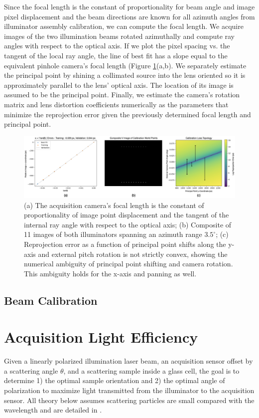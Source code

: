 Since the focal length is the constant of proportionality for beam angle and image pixel displacement and the beam directions are known for all azimuth angles from illuminator assembly calibration, we can compute the focal length. We acquire images of the two illumination beams rotated azimuthally and compute ray angles with respect to the optical axis. If we plot the pixel spacing vs. the tangent of the local ray angle, the line of best fit has a slope equal to the equivalent pinhole camera's focal length (Figure \ref{fig:acquisition_camera_calibration}(a,b). We separately estimate the principal point by shining a collimated source into the lens oriented so it is approximately parallel to the lens' optical axis. The location of its image is assumed to be the principal point. Finally, we estimate the camera's rotation matrix and lens distortion coefficients numerically as the parameters that minimize the reprojection error given the previously determined focal length and principal point.
\begin{figure}
    \centering
    \includegraphics[width=\linewidth]{../figures/acqusition_camera_calibration.png}
    \caption{(a) The acquisition camera's focal length is the constant of proportionality of image point displacement and the tangent of the internal ray angle with respect to the optical axis; (b) Composite of 11 images of both illuminators spanning an azimuth range $3.5^\circ$; (c) Reprojection error as a function of principal point shifts along the y-axis and external pitch rotation is not strictly convex, showing the numerical ambiguity of principal point shifting and camera rotation. This ambiguity holds for the x-axis and panning as well.}
    \label{fig:acquisition_camera_calibration}
\end{figure}

\subsection{Beam Calibration}




\section{Acquisition Light Efficiency}
Given a linearly polarized illumination laser beam, an acquisition sensor offset by a scattering angle $\theta$, and a scattering sample inside a glass cell, the goal is to determine 1) the optimal sample orientation and 2) the optimal angle of polarization to maximize light transmitted from the illuminator to the acquisition sensor. All theory below assumes scattering particles are small compared with the wavelength and are detailed in \cite{born2013principles}.

